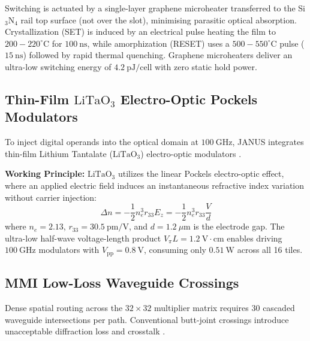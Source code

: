 \documentclass[journal]{IEEEtran}
\begin{document}
Switching is actuated by a single-layer graphene microheater \cite{Zheng2020Graphene} transferred to the Si$_3$N$_4$ rail top surface (not over the slot), minimising parasitic optical absorption. Crystallization (SET) is induced by an electrical pulse heating the film to $200-220^\circ\mathrm{C}$ for $100~\mathrm{ns}$, while amorphization (RESET) uses a $500-550^\circ\mathrm{C}$ pulse ($15~\mathrm{ns}$) followed by rapid thermal quenching. Graphene microheaters deliver an ultra-low switching energy of $4.2~\mathrm{pJ/cell}$ with zero static hold power.

\subsection{Thin-Film \texorpdfstring{$\mathrm{LiTaO_3}$}{LiTaO3} Electro-Optic Pockels Modulators}
To inject digital operands into the optical domain at $100~\mathrm{GHz}$, JANUS integrates thin-film Lithium Tantalate ($\mathrm{LiTaO_3}$) electro-optic modulators \cite{Wang2024LiTaO3}\cite{Weigel2018}.

\textbf{Working Principle:} $\mathrm{LiTaO_3}$ utilizes the linear Pockels electro-optic effect, where an applied electric field induces an instantaneous refractive index variation without carrier injection:
\begin{equation}
    \Delta n = -\frac{1}{2} n_e^3 r_{33} E_z = -\frac{1}{2} n_e^3 r_{33} \frac{V}{d}
\end{equation}
where $n_e = 2.13$, $r_{33} = 30.5~\mathrm{pm/V}$, and $d = 1.2~\mu\mathrm{m}$ is the electrode gap. The ultra-low half-wave voltage-length product $V_\pi L = 1.2~\mathrm{V\cdot cm}$ enables driving $100~\mathrm{GHz}$ modulators with $V_{\mathrm{pp}} = 0.8~\mathrm{V}$, consuming only $0.51~\mathrm{W}$ across all 16 tiles.

\subsection{MMI Low-Loss Waveguide Crossings}
Dense spatial routing across the $32 \times 32$ multiplier matrix requires 30 cascaded waveguide intersections per path. Conventional butt-joint crossings introduce unacceptable diffraction loss and crosstalk \cite{Chen2014MMI}.
\end{document}
